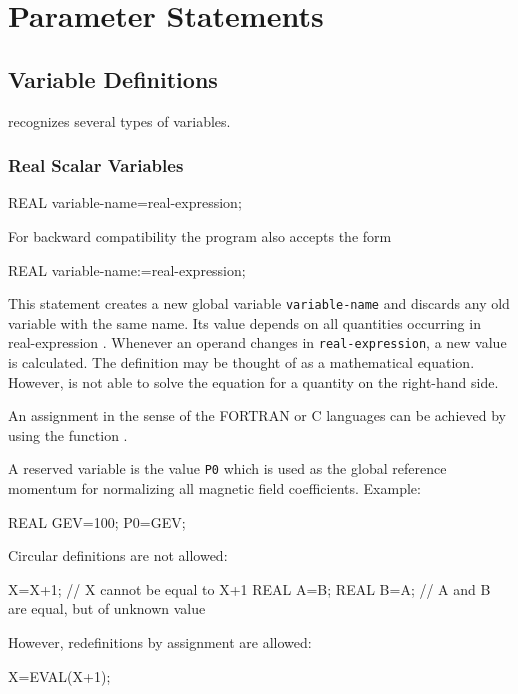 \section{Parameter Statements}
\label{sec:parameter}

\subsection{Variable Definitions}
\label{sec:variable}
\opal recognizes several types of variables.

\subsubsection{Real Scalar Variables}
\begin{example}
REAL variable-name=real-expression;
\end{example}
For backward compatibility the program also accepts the form
\begin{example}
REAL variable-name:=real-expression;
\end{example}
This statement creates a new global variable \texttt{variable-name}
and discards any old variable with the same name.
Its value depends on all quantities occurring
in {real-expression} .
Whenever an operand changes in \texttt{real-expression},
a new value is calculated.
The definition may be thought of as a mathematical equation.
However, \opal is not able to solve the equation for a quantity on the
right-hand side.

An assignment in the sense of the FORTRAN or C languages can be achieved
by using the  function .

A reserved variable is the value \texttt{P0} which is used as the
global reference momentum for normalizing all magnetic field coefficients.
\noindent Example:
\begin{example}
REAL GEV=100;
P0=GEV;
\end{example}
Circular definitions are not allowed:
\begin{example}
X=X+1;    // X cannot be equal to X+1
REAL A=B;
REAL B=A;      // A and B are equal, but of unknown value
\end{example}
However, redefinitions by assignment are allowed:
\begin{example}
X=EVAL(X+1);
\end{example}

